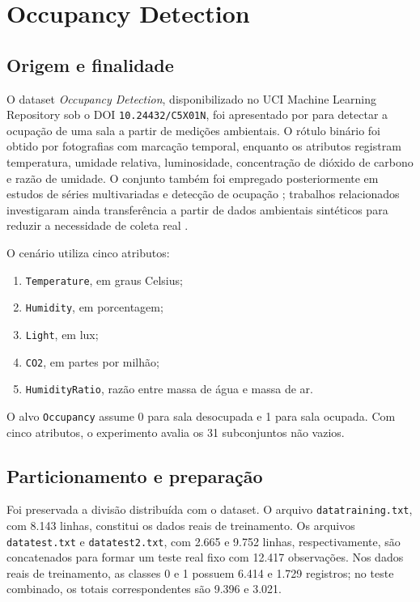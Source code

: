 \section{Occupancy Detection}

\subsection{Origem e finalidade}

O dataset \textit{Occupancy Detection}, disponibilizado no UCI Machine Learning Repository sob o DOI \texttt{10.24432/C5X01N}, foi apresentado por \textcite{candanedo2016} para detectar a ocupação de uma sala a partir de medições ambientais. O rótulo binário foi obtido por fotografias com marcação temporal, enquanto os atributos registram temperatura, umidade relativa, luminosidade, concentração de dióxido de carbono e razão de umidade. O conjunto também foi empregado posteriormente em estudos de séries multivariadas e detecção de ocupação \cite{Wu2019}; trabalhos relacionados investigaram ainda transferência a partir de dados ambientais sintéticos para reduzir a necessidade de coleta real \cite{Weber2020}.

O cenário utiliza cinco atributos:

\begin{enumerate}[label=$X_{\arabic*}$:]
  \item \texttt{Temperature}, em graus Celsius;
  \item \texttt{Humidity}, em porcentagem;
  \item \texttt{Light}, em lux;
  \item \texttt{CO2}, em partes por milhão;
  \item \texttt{HumidityRatio}, razão entre massa de água e massa de ar.
\end{enumerate}

O alvo \texttt{Occupancy} assume 0 para sala desocupada e 1 para sala ocupada. Com cinco atributos, o experimento avalia os 31 subconjuntos não vazios.

\subsection{Particionamento e preparação}

Foi preservada a divisão distribuída com o dataset. O arquivo \texttt{datatraining.txt}, com 8.143 linhas, constitui os dados reais de treinamento. Os arquivos \texttt{datatest.txt} e \texttt{datatest2.txt}, com 2.665 e 9.752 linhas, respectivamente, são concatenados para formar um teste real fixo com 12.417 observações. Nos dados reais de treinamento, as classes 0 e 1 possuem 6.414 e 1.729 registros; no teste combinado, os totais correspondentes são 9.396 e 3.021.

